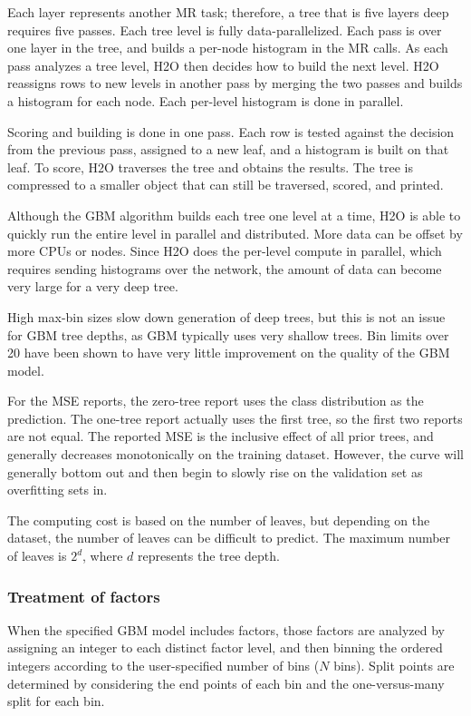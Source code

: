 \documentclass{article}[11pt]
\begin{document}
{Each layer represents another MR task; therefore, a tree that is five layers deep requires five passes. Each tree level is fully data-parallelized. Each pass is over one layer in the tree, and builds a per-node histogram in the MR calls. As each pass analyzes a tree level, H2O then decides how to build the next level. H2O reassigns rows to new levels in another pass by merging the two passes and builds a histogram for each node. Each per-level histogram is done in parallel. 

Scoring and building is done in one pass. Each row is tested against the decision from the previous pass, assigned to a new leaf, and a histogram is built on that leaf. To score, H2O traverses the tree and obtains the results. The tree is compressed to a smaller object that can still be traversed, scored, and printed. 

Although the GBM algorithm builds each tree one level at a time, H2O is able to quickly run the entire level in parallel and distributed. More data can be offset by more CPUs or nodes.  Since H2O does the per-level compute in parallel, which requires sending histograms over the network, the amount of data can become very large for a very deep tree. 

High max-bin sizes slow down generation of deep trees, but this is not an issue for GBM tree depths, as GBM typically uses very shallow trees. Bin limits over 20 have been shown to have very little improvement on the quality of the GBM model. 

For the MSE reports, the zero-tree report uses the class distribution as the prediction. The one-tree report actually uses the first tree, so the first two reports are not equal. The reported MSE is the inclusive effect of all prior trees, and generally decreases monotonically on the training dataset. However, the curve will generally bottom out and then begin to slowly rise on the validation set as overfitting sets in. 

The computing cost is based on the number of leaves, but depending on the dataset, the number of leaves can be difficult to predict. The maximum number of leaves is $2^d$, where $d$ represents the tree depth.

\subsubsection{Treatment of factors}

When the specified GBM model includes factors, those factors are analyzed by assigning an integer to each distinct factor level, and then binning the ordered integers according to the user-specified number of bins ($N$ bins). Split points are determined by considering the end points of each bin and the one-versus-many split for each bin. 

}
\end{document}
